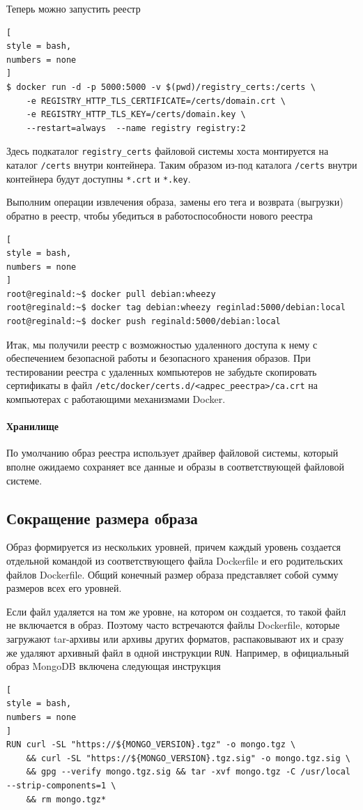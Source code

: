 \documentclass[%
	11pt,
	a4paper,
	utf8,
		]{article}
\begin{document}
Теперь можно запустить реестр
\begin{lstlisting}[
style = bash,
numbers = none
]
$ docker run -d -p 5000:5000 -v $(pwd)/registry_certs:/certs \
    -e REGISTRY_HTTP_TLS_CERTIFICATE=/certs/domain.crt \
    -e REGISTRY_HTTP_TLS_KEY=/certs/domain.key \
    --restart=always  --name registry registry:2
\end{lstlisting}

Здесь подкаталог \texttt{registry\_certs} файловой системы хоста монтируется на каталог \texttt{/certs} внутри контейнера. Таким образом из-под каталога \texttt{/certs} внутри контейнера будут доступны \texttt{*.crt} и \texttt{*.key}.

Выполним операции извлечения образа, замены его тега и возврата (выгрузки) обратно в реестр, чтобы убедиться в работоспособности нового реестра
\begin{lstlisting}[
style = bash,
numbers = none
]
root@reginald:~$ docker pull debian:wheezy
root@reginald:~$ docker tag debian:wheezy reginlad:5000/debian:local
root@reginald:~$ docker push reginald:5000/debian:local
\end{lstlisting}

Итак, мы получили реестр с возможностью удаленного доступа к нему с обеспечением безопасной работы и безопасного хранения образов. При тестировании реестра с удаленных компьютеров не забудьте скопировать сертификаты в файл \texttt{/etc/docker/certs.d/<адрес\_реестра>/ca.crt} на компьютерах с работающими механизмами Docker.

\paragraph{Хранилище} По умолчанию образ реестра использует драйвер файловой системы, который вполне ожидаемо сохраняет все данные и образы в соответствующей файловой системе.

\subsection{Сокращение размера образа}

Образ формируется из нескольких уровней, причем каждый уровень создается отдельной командой из соответствующего файла Dockerfile и его родительских файлов Dockerfile. Общий конечный размер образа представляет собой сумму размеров всех его уровней.

Если файл удаляется на том же уровне, на котором он создается, то такой файл не включается в образ. Поэтому часто встречаются файлы Dockerfile, которые загружают tar-архивы или архивы других форматов, распаковывают их и сразу же удаляют архивный файл в одной инструкции \texttt{RUN}. Например, в официальный образ MongoDB включена следующая инструкция
\begin{lstlisting}[
style = bash,
numbers = none
]
RUN curl -SL "https://${MONGO_VERSION}.tgz" -o mongo.tgz \
    && curl -SL "https://${MONGO_VERSION}.tgz.sig" -o mongo.tgz.sig \
    && gpg --verify mongo.tgz.sig && tar -xvf mongo.tgz -C /usr/local --strip-components=1 \
    && rm mongo.tgz*
\end{lstlisting}
\end{document}
